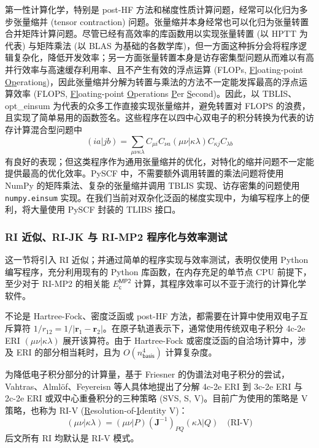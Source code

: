 第一性计算化学，特别是 post-HF 方法和梯度性质计算问题，经常可以化归为多步张量缩并 (tensor contraction) 问题。张量缩并本身经常也可以化归为张量转置合并矩阵计算问题。尽管已经有高效率的库函数用以实现张量转置 (以 HPTT 为代表) 与矩阵乘法 (以 BLAS 为基础的各数学库)，但一方面这种拆分会将程序逻辑复杂化，降低开发效率；另一方面张量转置本身是访存密集型问题从而难以有高并行效率与高速缓存利用率、且不产生有效的浮点运算 (FLOPs, \underline{Fl}oating-point \underline{Op}eration\underline{s})，因此张量缩并分解为转置与乘法的方法不一定能发挥最高的浮点运算效率 (FLOPS, \underline{Fl}oating-point \underline{O}perations \underline{P}er \underline{S}econd)。因此，以 TBLIS、opt\_einsum 为代表的众多工作直接实现张量缩并，避免转置对 FLOPS 的浪费，且实现了简单易用的函数签名。这些程序在以四中心双电子的积分转换为代表的访存计算混合型问题中
\begin{equation*}
  (ia|jb) = \sum_{\mu \nu \kappa \lambda} C_{\mu i} C_{\nu a} (\mu \nu | \kappa \lambda) C_{\kappa j} C_{\lambda b}
\end{equation*}
有良好的表现；但这类程序作为通用张量缩并的优化，对特化的缩并问题不一定能提供最高的优化效率。PySCF 中，不需要额外调用转置的乘法问题将使用 NumPy 的矩阵乘法、复杂的张量缩并调用 TBLIS 实现、访存密集的问题使用 \verb|numpy.einsum| 实现。在我们当前对双杂化泛函的梯度实现中，为编写程序上的便利，将大量使用 PySCF 封装的 TLIBS 接口。

\subsubsection{RI 近似、RI-JK 与 RI-MP2 程序化与效率测试}
\label{sec.rijk-rimp2-efficiency}

这一节将引入 RI 近似；并通过简单的程序实现与效率测试，表明仅使用 Python 编写程序，充分利用现有的 Python 库函数，在内存充足的单节点 CPU 前提下，至少对于 RI-MP2 的相关能 $E_\textsf{c}^\textsf{MP2}$ 计算，其程序效率可以不亚于流行的计算化学软件。

不论是 Hartree-Fock、密度泛函或 post-HF 方法，都需要在计算中使用双电子互斥算符 $1 / r_{12} = 1 / |\bm{r}_1 - \bm{r}_2|$。在原子轨道表示下，通常使用传统双电子积分 4c-2e ERI $(\mu \nu | \kappa \lambda)$ 展开该算符。由于 Hartree-Fock 或密度泛函的自洽场计算中，涉及 ERI 的部分相当耗时，且为 $O(n_\textsf{basis}^4)$ 计算复杂度。

为降低电子积分部分的计算量，基于 Friesner 的伪谱法对电子积分的尝试\cite{Friesner-Friesner.CPL.1985, Friesner-Friesner.JCP.1987}，Vahtras、Alml\"of、Feyereisn 等人具体地提出了分解 4c-2e ERI 到 3c-2e ERI 与 2c-2e ERI 或双中心重叠积分的三种策略 (SVS, S, V)\cite{Vahtras-Feyereisen.CPL.1993}。目前广为使用的策略是 V 策略，也称为 RI-V (\underline{R}esolution-of-\underline{I}dentity V)：
\begin{equation}
  (\mu \nu | \kappa \lambda) = (\mu \nu | P) (\mathbf{J}^{-1})_{PQ} (\kappa \lambda | Q) \quad \text{(RI-V)}
\end{equation}
后文所有 RI 均默认是 RI-V 模式。

